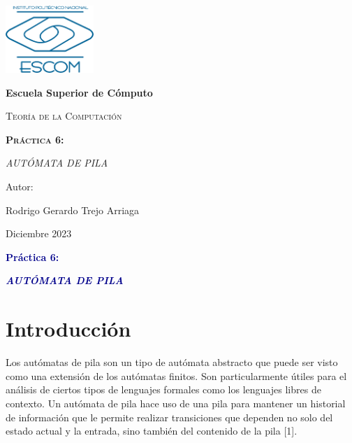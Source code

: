 \documentclass[11pt]{article} %
\begin{document}
	
	\begin{titlepage}
		\centering
		{\includegraphics[width=0.25\textwidth]{descarga}\par}
		\vspace{0.5cm}
		{\bfseries\huge Escuela Superior de Cómputo \par}
		\vspace{0.7cm}
		{\scshape\LARGE Teoría de la Computación \par}
		\vspace{0.3cm}
		\vspace{3.1cm}
		{\scshape \Huge \textbf{Práctica 6:}  \par}
		\vspace{0.03cm}
		{{\LARGE \textit{AUTÓMATA DE PILA}} \par}
		\vspace{3.5cm}
		{\Large Autor: \par}
		{\Large Rodrigo Gerardo Trejo Arriaga \par}
		\vspace{3cm}
		{\Large Diciembre 2023 \par}
	\end{titlepage}
	
	\begin{center}
		\vspace*{0.1cm}
		{\huge \textcolor{darkBlue}{\textbf{Práctica 6:}} \par}
		
		{\Large \textcolor{darkBlue}{\textbf{\textit{AUTÓMATA DE PILA}}}}
	\end{center}
	
	
	\section{Introducción}
	Los autómatas de pila son un tipo de autómata abstracto que puede ser visto como una extensión de los autómatas finitos. Son particularmente útiles para el análisis de ciertos tipos de lenguajes formales como los lenguajes libres de contexto. Un autómata de pila hace uso de una pila para mantener un historial de información que le permite realizar transiciones que dependen no solo del estado actual y la entrada, sino también del contenido de la pila [1].
	
\end{document}
